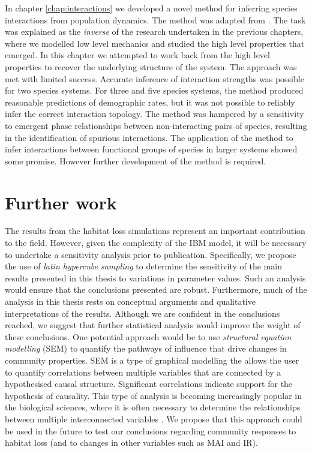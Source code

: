 In chapter \ref{chap:interactions} we developed a novel method for inferring species interactions from population dynamics. The method was adapted from \cite{shandilya2011inferring}. The task was explained as the \emph{inverse} of the research undertaken in the previous chapters, where we modelled low level mechanics and studied the high level properties that emerged. In this chapter we attempted to work back from the high level properties to recover the underlying structure of the system. The approach was met with limited success. Accurate inference of interaction strengths was possible for two species systems. For three and five species systems, the method produced reasonable predictions of demographic rates, but it was not possible to reliably infer the correct interaction topology. The method was hampered by a sensitivity to emergent phase relationships between non-interacting pairs of species, resulting in the identification of spurious interactions. The application of the method to infer interactions between functional groups of species in larger systems showed some promise. However further development of the method is required. 


\section{Further work}
\label{sec:further_work}

The results from the habitat loss simulations represent an important contribution to the field. However, given the complexity of the IBM model, it will be necessary to undertake a sensitivity analysis prior to publication. Specifically, we propose the use of \emph{latin hypercube sampling} \cite{helton2003latin} to determine the sensitivity of the main results presented in this thesis to variations in parameter values. Such an analysis would ensure that the conclusions presented are robust. Furthermore, much of the analysis in this thesis rests on conceptual arguments and qualitative interpretations of the results. Although we are confident in the conclusions reached, we suggest that further statistical analysis would improve the weight of these conclusions. One potential approach would be to use \emph{structural equation modelling} (SEM) to quantify the pathways of influence that drive changes in community properties. SEM is a type of graphical modelling the allows the user to quantify correlations between multiple variables that are connected by a hypothesised causal structure. Significant correlations indicate support for the hypothesis of causality. This type of analysis is becoming increasingly popular in the biological sciences, where it is often necessary to determine the relationships between multiple interconnected variables \cite{lefcheck2015piecewisesem,yvon2015five}. We propose that this approach could be used in the future to test our conclusions regarding community responses to habitat loss (and to changes in other variables such as MAI and IR).


